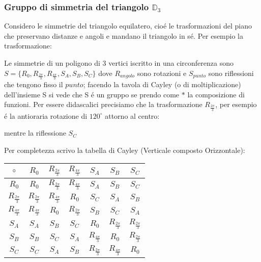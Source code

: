 \documentclass[oneside,12pt]{memoir}
\begin{document}
\subsubsection{Gruppo di simmetria del triangolo \texorpdfstring{$\mathbb{D}_3$}{D3}}

Considero le simmetrie del triangolo equilatero, cio\'e le trasformazioni del piano che preservano distanze e angoli e mandano il triangolo in s\'e. Per esempio la trasformazione:




Le simmetrie di un poligono di 3 vertici iscritto in una circonferenza sono
$S=\{R_0,R_{\frac{2 \pi}{3}},R_{\frac{4 \pi}{3}},S_A,S_B,S_C \}$ dove $R_{angolo}$ sono rotazioni e $S_{punto}$ sono riflessioni che tengono fisso il $punto$; facendo la tavola di Cayley (o di moltiplicazione) dell'insieme S si vede che S \'e un gruppo se prendo come $*$ la composizione di funzioni.
Per essere didascalici precisiamo che la trasformazione $R_{\frac{2\pi}{3}}$, per esempio \'e la antioraria rotazione di $120^\circ$ attorno al centro: 


 
mentre la riflessione $S_C$



Per completezza scrivo la tabella di Cayley (Verticale composto Orizzontale):



\begin{tabular}{|c||c|c|c|c|c|c|}\hline
$\circ$ & $R_0$ & $R_{\frac{2 \pi}{3}}$ & $R_{\frac{4 \pi}{3}}$ & $S_A$ & $S_B$ & $S_C$ \\ \hline
$R_0$ & $R_0$ & $R_{\frac{2 \pi}{3}}$ & $R_{\frac{4 \pi}{3}}$ & $S_A$ & $S_B$ & $S_C$ \\
$R_{\frac{2 \pi}{3}}$ & $R_{\frac{2\pi}{3}}$ & $R_{\frac{4\pi}{3}}$ & $R_0$ & $S_C$ & $S_A$ & $S_B$ \\
$R_{\frac{4 \pi}{3}}$ & $R_{\frac{4\pi}{3}}$ & $R_0$ & $R_{\frac{2\pi}{3}}$ & $S_B$ & $S_C$ & $S_A$ \\
$S_A$ & $S_A$ & $S_B$ & $S_C$ & $R_0$ & $R_{\frac{2\pi}{3}}$ & $R_{\frac{2\pi}{3}}$ \\
$S_B$ & $S_B$ & $S_C$ & $S_A$ & $R_{\frac{4\pi}{3}}$ & $R_0$ & $R_{\frac{2\pi}{3}}$ \\
$S_C$ & $S_C$ & $S_A$ & $S_B$ & $R_{\frac{2\pi}{3}}$ & $R_{\frac{4\pi}{3}}$ & $R_0$ \\ \hline
\end{tabular}
\end{document}
